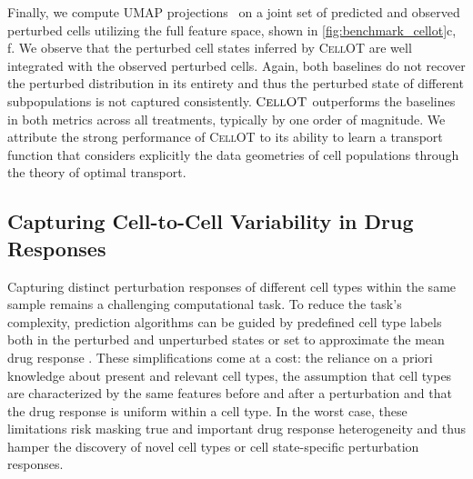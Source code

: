  Finally, we compute \acrfull{UMAP} projections~\citep{umap} on a joint set of predicted and observed perturbed cells utilizing the full feature space, shown in \cref{fig:benchmark_cellot}c, f.
We observe that the perturbed cell states inferred by \textsc{CellOT} are well integrated with the observed perturbed cells. Again, both baselines do not recover the perturbed distribution in its entirety %
and thus the perturbed state of different subpopulations is not captured consistently.
$\textsc{CellOT}$ outperforms the baselines in both metrics across all treatments, typically by one order of magnitude.
We attribute the strong performance of \textsc{CellOT} to its ability to learn a transport function that considers explicitly the data geometries of cell populations through the theory of optimal transport.

\subsection{Capturing Cell-to-Cell Variability in Drug Responses}
 Capturing distinct perturbation responses of different cell types within the same sample remains a challenging computational task. To reduce the task's complexity, prediction algorithms can be guided by predefined cell type labels both in the perturbed and unperturbed states \citep{chen2020dissecting} or set to approximate the mean drug response \citep{lotfollahi2019scgen}.  These simplifications come at a cost: the reliance on a priori knowledge about present and relevant cell types, the assumption that cell types are characterized by the same features before and after a perturbation and that the drug response is uniform within a cell type.
In the worst case, these limitations risk masking true and important drug response heterogeneity  and thus hamper the discovery of novel cell types or cell state-specific perturbation responses.

